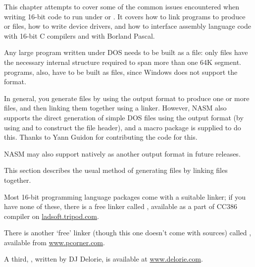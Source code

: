 %
%

This chapter attempts to cover some of the common issues encountered
when writing 16-bit code to run under  or .
It covers how to link programs to produce  or  files,
how to write  device drivers, and how to interface assembly
language code with 16-bit C compilers and with Borland Pascal.


Any large program written under DOS needs to be built as a 
file: only  files have the necessary internal structure
required to span more than one 64K segment.  programs,
also, have to be built as  files, since Windows does not
support the  format.

In general, you generate  files by using the  output
format to produce one or more  files, and then linking
them together using a linker. However, NASM also supports the direct
generation of simple DOS  files using the  output
format (by using  and  to construct the  file
header), and a macro package is supplied to do this. Thanks to
Yann Guidon for contributing the code for this.

NASM may also support  natively as another output format in
future releases.


This section describes the usual method of generating  files
by linking  files together.

Most 16-bit programming language packages come with a suitable
linker; if you have none of these, there is a free linker called
, available as a part of
CC386 compiler on \href{http://ladsoft.tripod.com/cc386\_compiler.html}
{ladsoft.tripod.com}.

There is another `free' linker (though this one doesn't come with
sources) called , available
from \href{http://www.pcorner.com/tpc/old/3-101.html}{www.pcorner.com}.

A third, , written by DJ Delorie, is available at
\href{http://www.delorie.com/djgpp/16bit/djlink/}{www.delorie.com}.

